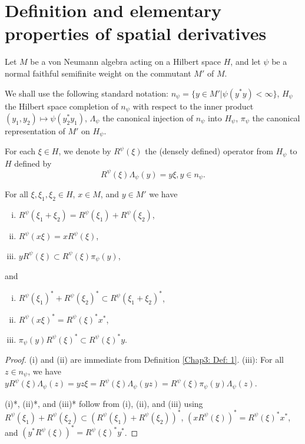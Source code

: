 \section{Definition and elementary properties of spatial derivatives}
Let $M$ be a von Neumann algebra acting on a Hilbert space $H$, and let $\psi$ be a normal faithful semifinite weight on the commutant $M'$ of $M$.\par
We shall use the following standard notation: $n_\psi=\{y\in M'|\psi(y^*y)<\infty\}$, $H_\psi$ the Hilbert space completion of $n_\psi$ with respect to the inner product $(y_1,y_2)\mapsto \psi(y_2^*y_1)$, $\Lambda_\psi$ the canonical injection of $n_\psi$ into $H_\psi$, $\pi_\psi$ the canonical representation of $M'$ on $H_\psi$.
\begin{definition}\label{Chap3: Def: 1}
    For each $\xi\in H$, we denote by $R^\psi(\xi)$ the (densely defined) operator from $H_\psi$ to $H$ defined by
    \begin{equation}
        R^\psi(\xi)\Lambda_\psi(y)=y\xi,y\in n_\psi.
    \end{equation}
\end{definition}
\begin{proposition}
    For all $\xi,\xi_1,\xi_2\in H$, $x\in M$, and $y\in M'$ we have
    \begin{enumerate}[(i)]
        \item $R^\psi(\xi_1+\xi_2)=R^\psi(\xi_1)+R^\psi(\xi_2)$,
        \item $R^\psi(x\xi)=xR^\psi(\xi)$,
        \item $yR^\psi(\xi)\subset R^\psi(\xi)\pi_\psi(y)$,
    \end{enumerate}
    and
    \begin{enumerate}[(i)*]
        \item $R^\psi(\xi_1)^*+R^\psi(\xi_2)^*\subset R^\psi(\xi_1+\xi_2)^*$,
        \item $R^\psi(x\xi)^*=R^\psi(\xi)^*x^*$,
        \item $\pi_\psi(y)R^\psi(\xi)^*\subset R^\psi(\xi)^*y$.
    \end{enumerate}
\end{proposition}
\begin{proof}
    (i) and (ii) are immediate from Definition \ref{Chap3: Def: 1}. (iii): For all $z\in n_\psi$, we have $yR^\psi(\xi)\Lambda_\psi(z)=yz\xi=R^\psi(\xi)\Lambda_\psi(yz)=R^\psi(\xi)\pi_\psi(y)\Lambda_\psi(z)$.\par
    (i)*, (ii)*, and (iii)* follow from (i), (ii), and (iii) using $R^\psi(\xi_1)+R^\psi(\xi_2)\subset (R^\psi(\xi_1)+R^\psi(\xi_2))^*$, $(xR^\psi(\xi))^*=R^\psi(\xi)^*x^*$, and $(y^*R^\psi(\xi))^*=R^\psi(\xi)^*y^*$.
\end{proof}
